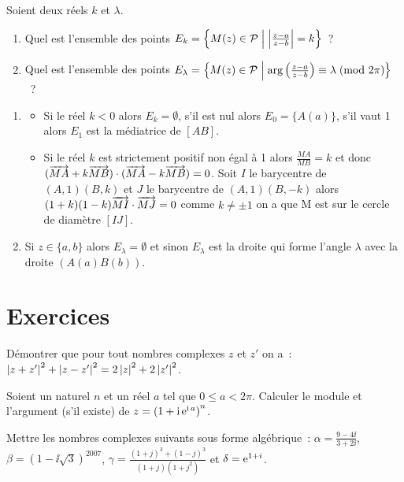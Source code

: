 Soient deux réels \(k\) et \(\lambda\).
\begin{enumerate}
  \item Quel est l'ensemble des points \(E_k = \left\{M(z) \in{}
    \mathcal{P}\mathrel{}\middle|\mathrel{}\left\lvert\frac{z-a}{z-b}\right\rvert = k\right\}\)~?
  \item Quel est l'ensemble des points \(E_\lambda = \left\{M(z) \in{}
    \mathcal{P}\mathrel{}\middle|\mathrel{}\arg \left(\frac{z-a}{z-b} \right) \equiv \lambda\!\pmod {2\pi}\right\}\)~?
\end{enumerate}
\begin{enumerate}
  \item
    \begin{itemize}
      \item Si le réel \(k<0\) alors \(E_k = \emptyset\), s'il est nul
        alors \(E_0 = \{A(a)\}\), s'il vaut 1 alors \(E_1\) est la
        médiatrice de \([AB]\).
      \item Si le réel \(k\) est strictement positif non égal à 1 alors
        \(\frac{MA}{MB} = k\) et donc \((\overrightarrow{MA} + k\overrightarrow{MB}) \cdot
        (\overrightarrow{MA}-k\overrightarrow{MB}) = 0\). Soit \(I\) le barycentre de
        \((A,1)(B,k)\) et \(J\) le barycentre de \((A,1)(B,-k)\) alors
        \((1 + k)(1-k) \overrightarrow{MI} \cdot \overrightarrow{MJ}  = 0\) comme \(k \neq
        \pm 1\) on a que M est sur le cercle de diamètre \([IJ]\).
    \end{itemize}
  \item Si \(z \in{}\{a,b\}\) alors \(E_\lambda = \emptyset\) et sinon
    \(E_\lambda\) est la droite qui forme l'angle \(\lambda\) avec la droite
    \((A(a)B(b))\).
\end{enumerate}

\section{Exercices}

\begin{exercice}
  Démontrer que pour tout nombres complexes \(z\) et \(z'\) on a~:\(\left\lvert z +
  z'\right\rvert^2 + \left\lvert z-z'\right\rvert^2 = 2\left\lvert z\right\rvert^2 + 2\left\lvert z'\right\rvert^2\).
\end{exercice}

\begin{exercice}
  Soient un naturel \(n\) et un réel \(a\) tel que \(0 \leqslant a < 2\pi\).
  Calculer le module et l'argument (s'il existe) de \(z = {(1 + \operatorname{i}\operatorname{e}^{\operatorname{i}{}
  a})}^n\).
\end{exercice}

\begin{exercice}
  Mettre les nombres complexes suivants sous forme algébrique~: \(\alpha =
  \frac{9-4\ii}{3 + 2\ii}\), \(\beta = {(1-\ii\sqrt{3})}^{2007}\), \(\gamma =
  \frac{{(1+j)}^3 + {(1-j)}^3}{(1+j)(1+j^2)}\) et \(\delta = \operatorname{e}^{1+i}\).
\end{exercice}

